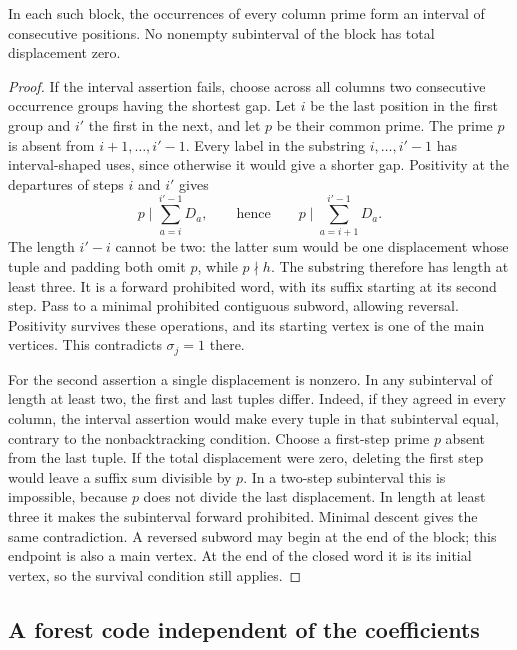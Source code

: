 \begin{lemma}\label{q:block-intervals}
In each such block, the occurrences of every column prime form an
interval of consecutive positions.  No nonempty subinterval of the
block has total displacement zero.
\end{lemma}

\begin{proof}
If the interval assertion fails, choose across all columns two
consecutive occurrence groups having the shortest gap.  Let $i$ be
the last position in the first group and $i'$ the first in the next,
and let $p$ be their common prime.  The prime $p$ is absent from
$i+1,\ldots,i'-1$.  Every label in the substring
$i,\ldots,i'-1$ has interval-shaped uses, since otherwise it would
give a shorter gap.  Positivity at the departures of steps $i$ and
$i'$ gives
\[
 p\mid \sum_{a=i}^{i'-1}D_a,
 \qquad\text{hence}\qquad
 p\mid \sum_{a=i+1}^{i'-1}D_a.
\]
The length $i'-i$ cannot be two: the latter sum would be one
displacement whose tuple and padding both omit $p$, while $p\nmid h$.
The substring therefore has length at least three.  It is a forward
prohibited word, with its suffix starting at its second step.
Pass to a minimal prohibited contiguous subword, allowing reversal.
Positivity survives these operations, and its starting vertex is
one of the main vertices.  This contradicts $\sigma_j=1$ there.

For the second assertion a single displacement is nonzero.  In any
subinterval of length at least two, the first and last tuples differ.
Indeed, if they agreed in every column, the interval assertion would
make every tuple in that subinterval equal, contrary to the
nonbacktracking condition.  Choose a first-step prime $p$ absent
from the last tuple.  If the total displacement were zero, deleting
the first step would leave a suffix sum divisible by $p$.  In a
two-step subinterval this is impossible, because $p$ does not divide
the last displacement.  In length at least three it makes the
subinterval forward prohibited.  Minimal descent gives the same
contradiction.  A reversed subword may begin at the end of the block;
this endpoint is also a main vertex.  At the end of the closed word
it is its initial vertex, so the survival condition still applies.
\end{proof}

\subsection{A forest code independent of the coefficients}


